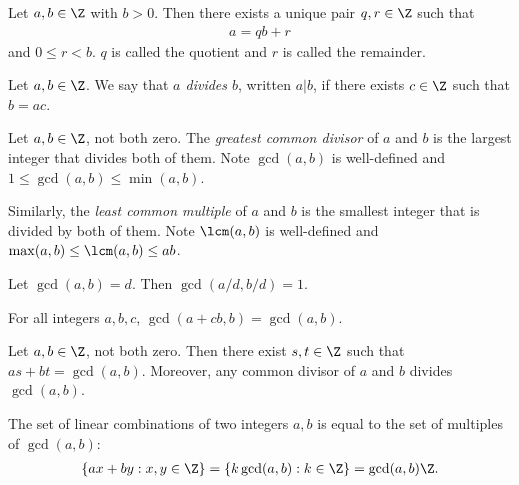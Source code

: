 \documentclass{article}
\begin{document}
\begin{theorem}
	Let $a,b\in\Z$ with $b>0$. Then there exists a unique pair $q,r\in\Z$ such that
	\begin{align*}
		a = qb + r
	\end{align*}
	and $0\leq r<b$. $q$ is called the quotient and $r$ is called the remainder.
\end{theorem}

\begin{definition}
	Let $a,b\in\Z$. We say that \emph{$a$ divides $b$}, written $a|b$, if there exists $c\in\Z$
	such that $b=ac$.
\end{definition}

\begin{definition}
	Let $a,b\in\Z$, not both zero. The \emph{greatest common divisor} of $a$ and $b$ is the largest integer
	that divides both of them. Note $\gcd(a,b)$ is well-defined and $1\leq\gcd(a,b)\leq\min(a,b)$.

	Similarly, the \emph{least common multiple} of $a$ and $b$ is the smallest
	integer that is divided by both of them. Note $\lcm(a,b)$ is well-defined
	and $\max(a,b)\leq\lcm(a,b)\leq ab$.
\end{definition}

\begin{proposition}[Boocher 3.3]
	Let $\gcd(a,b)=d$. Then $\gcd(a/d,b/d)=1$.
\end{proposition}

\begin{proposition}[Boocher 3.4]
	For all integers $a,b,c$, $\gcd(a+cb,b)=\gcd(a,b)$.
\end{proposition}

\begin{theorem}
	Let $a,b\in\Z$, not both zero. Then there exist $s,t\in\Z$ such that
	$as + bt = \gcd(a,b)$. Moreover, any common divisor of $a$ and $b$ divides $\gcd(a,b)$.
\end{theorem}

\begin{corollary}[Boocher 3.7]
	The set of linear combinations of two integers $a,b$ is equal to the set
	of multiples of $\gcd(a,b)$:
	\begin{align*}
		\{ax+by : x,y\in\Z \} = \{k\gcd(a,b):k\in\Z\}=\gcd(a,b)\Z.
	\end{align*}
\end{corollary}
\end{document}
